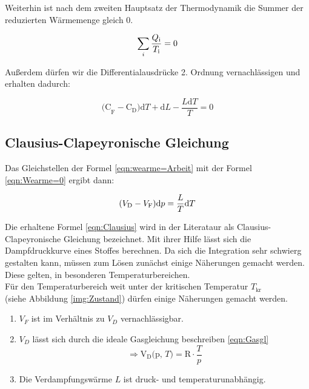 \noindent Weiterhin ist nach dem zweiten Hauptsatz der Thermodynamik die Summer der reduzierten Wärmemenge gleich 0.

\begin{equation}
    \sum_{i}\frac{Q_\text{i}}{T_\text{i}}=0\nonumber\\
\end{equation}

\noindent Außerdem dürfen wir die Differentialausdrücke 2. Ordnung vernachlässigen und erhalten dadurch:

\begin{equation} 
    \text{(C}_\text{F} - \text{C}_\text{D}\text{)d}T + \text{d}L -\frac{L\text{d}T}{T}= 0
    \label{eqn:Wearme=0}
\end{equation}

\subsection{Clausius-Clapeyronische Gleichung}

\noindent Das Gleichstellen der Formel \eqref{eqn:wearme=Arbeit} mit der Formel \eqref{eqn:Wearme=0} ergibt dann:

\begin{equation}
    (V_\text{D}-V_\text{F})\text{d}p =\frac{L}{T}\text{d}T\\
    \label{eqn:Clausius}
\end{equation}

\noindent Die erhaltene Formel \eqref{eqn:Clausius} wird in der Literataur als Clausius-Clapeyronische Gleichung bezeichnet. Mit ihrer Hilfe 
lässt sich die Dampfdruckkurve eines Stoffes berechnen. Da sich die Integration sehr schwierg gestalten kann, müssen zum Lösen
zunächst einige Näherungen gemacht werden. Diese gelten, in besonderen Temperaturbereichen.\\

\noindent Für den Temperaturbereich weit unter der kritischen Temperatur $T_\text{kr}$ \\ (siehe Abbildung \ref{img:Zustand}) dürfen einige 
Näherungen gemacht werden.
\begin{enumerate}
    \item $V_F$ ist im Verhältnis zu $V_D$ vernachlässigbar.
    \item $V_D$ lässt sich durch die ideale Gasgleichung beschreiben \eqref{eqn:Gasgl}\\
            \begin{equation}
                \Rightarrow \text{V}_\text{D} \text{(p, }T\text{)} = \text{R} \cdot \frac{T}{p} \nonumber
            \end{equation}
    \item Die Verdampfungswärme $L$ ist druck- und temperaturunabhängig.
\end{enumerate}

